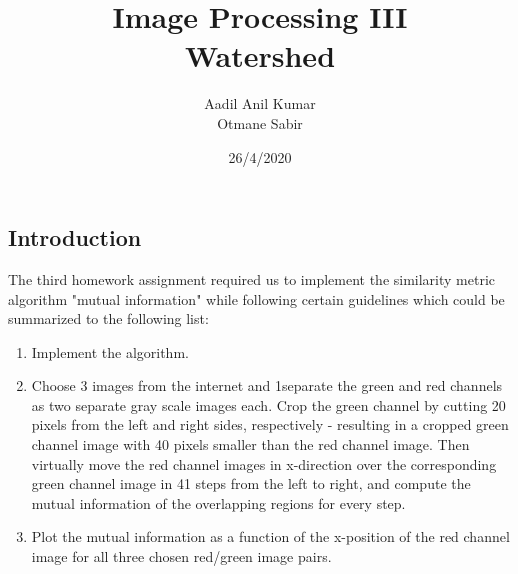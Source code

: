 \documentclass{article}
\begin{document}
\title{Image Processing III\\
 Watershed}
\author{Aadil Anil Kumar \\
Otmane Sabir
}
\date{26/4/2020}
\maketitle
\vspace{10mm}
\begin{center}
\section*{Introduction}
\large
The third homework assignment required us to implement the similarity metric algorithm "mutual information" while following certain guidelines which could be summarized to the following list: 
\vspace{7mm}
\begin{enumerate}
    \item Implement the algorithm.
    \item Choose 3 images from the internet and 1separate the green and red channels as two separate gray scale images each. Crop the green channel by cutting 20 pixels from the left and right sides, respectively - resulting in a cropped green channel image with 40 pixels smaller than the red channel image. Then virtually move the red channel images in x-direction over the corresponding green channel image in 41 steps from the left to right, and compute the mutual information of the overlapping regions for every step.
    \item Plot the mutual information as a function of the x-position of the red channel image for all three chosen red/green image pairs.
\end{enumerate}


\end{center}
\newpage

\tableofcontents

\newpage
\end{document}
